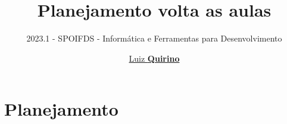 \documentclass{beamer}
\title{Planejamento volta as aulas}
\subtitle{2023.1 - SPOIFDS - Informática e Ferramentas para Desenvolvimento }
\author{\href{mailto:luizfpq@gmail.com}{Luiz \textbf{Quirino}}}
\newcommand{\hrefcol}[2]{\textcolor{cyan}{\href{#1}{#2}}}
\begin{document}
\maketitle

%
%





\section{Planejamento}
\end{document}
